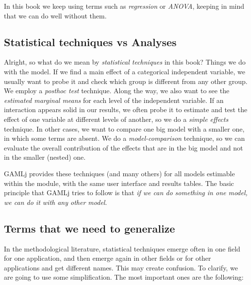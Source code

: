 \documentclass[
]{book}
\begin{document}
In this book we keep using terms such as \emph{regression} or \emph{ANOVA}, keeping in mind that we can do well without them.

\hypertarget{statistical-techniques-vs-analyses}{%
\subsection{Statistical techniques vs Analyses}\label{statistical-techniques-vs-analyses}}

Alright, so what do we mean by \emph{statistical techniques} in this book? Things we do with the model. If we find a main effect of a categorical independent variable, we usually want to probe it and check which group is different from any other group. We employ a \emph{posthoc test} technique. Along the way, we also want to see the \emph{estimated marginal means} for each level of the independent variable. If an interaction appears solid in our results, we often probe it to estimate and test the effect of one variable at different levels of another, so we do a \emph{simple effects} technique. In other cases, we want to compare one big model with a smaller one, in which some terms are absent. We do a \emph{model-comparison} technique, so we can evaluate the overall contribution of the effects that are in the big model and not in the smaller (nested) one.

{GAMLj} provides these techniques (and many others) for all models estimable within the module, with the same user interface and results tables. The basic principle that {GAMLj} tries to follow is that \emph{if we can do something in one model, we can do it with any other model}.

\hypertarget{terms-that-we-need-to-generalize}{%
\subsection{Terms that we need to generalize}\label{terms-that-we-need-to-generalize}}

In the methodological literature, statistical techniques emerge often in one field for one application, and then emerge again in other fields or for other applications and get different names. This may create confusion. To clarify, we are going to use some simplification. The most important ones are the following:
\end{document}
